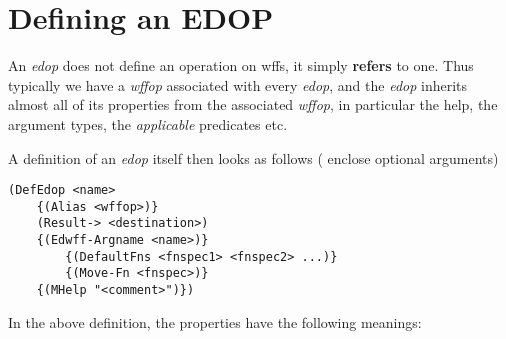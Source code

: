 \section{Defining an EDOP}

An {\it edop} does not define an operation on wffs, it simply
{\bf refers} to one.  Thus typically we have a {\it wffop} associated
with every {\it edop}, and the {\it edop} inherits almost all of its
properties from the associated {\it wffop}, in particular the
help, the argument types, the {\it applicable} predicates etc.

A definition of an {\it edop} itself then looks as follows
({\tt {}} enclose optional arguments)
\begin{verbatim}
(DefEdop <name>
	{(Alias <wffop>)}
	(Result-> <destination>)
	{(Edwff-Argname <name>)}
        {(DefaultFns <fnspec1> <fnspec2> ...)}
        {(Move-Fn <fnspec>)}
	{(MHelp "<comment>")})
\end{verbatim}

In the above definition, the properties have the following meanings:

